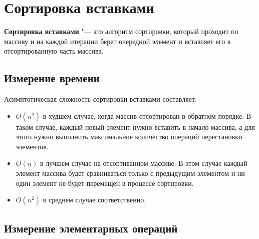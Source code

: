 \documentclass[11pt]{article}
\begin{document}
\section*{\centering Сортировка вставками}

\textbf{Сортировка вставками} "--- это алгоритм сортировки, который проходит по массиву и на
каждой итерации берет очередной элемент и вставляет его в отсортированную часть массива.

\setcounter{subsection}{0}
\subsection{Измерение времени}

\begin{center}
\end{center}
{ \hspace*{\fill} }

\begin{center}
\end{center}
{ \hspace*{\fill} }

Асимптотическая сложность сортировки вставками составляет:
\begin{itemize}
    \item $O(n^2)$ в худшем случае, когда массив отсортирован в обратном порядке. В таком случае,
          каждый новый элемент нужно вставить в начало массива, а для этого нужно выполнить максимальное количество операций перестановки элементов.
    \item $O(n)$ в лучшем случае на отсортиванном массиве. В этом случае каждый элемент массива будет сравниваться только с предыдущим элементом
          и ни один элемент не будет перемещен в процессе сортировки.
    \item $O(n^2)$ в среднем случае соответственно.
\end{itemize}

\subsection{Измерение элементарных операций}

\begin{center}
\end{center}
{ \hspace*{\fill} }
\end{document}

